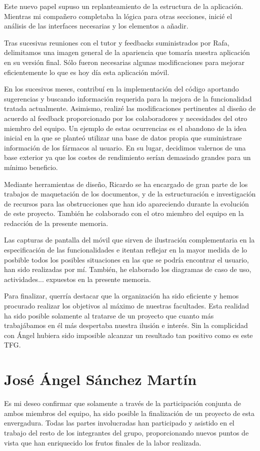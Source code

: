 \documentclass[11pt,spanish,
		listoftables,listoffigures]
		{tfgplantilla}
\begin{document}
Este nuevo papel supuso un replanteamiento de la estructura de la aplicación. Mientras mi compañero completaba la lógica para otras secciones, inicié el análisis de las interfaces necesarias y los elementos a añadir.

Tras sucesivas reuniones con el tutor y feedbacks suministrados por Rafa, delimitamos una imagen general de la apariencia que tomaría nuestra aplicación en su versión final. Sólo fueron necesarias algunas modificaciones para mejorar eficientemente lo que es hoy día esta aplicación móvil.

En los sucesivos meses, contribuí en la implementación del código aportando sugerencias y buscando información requerida para la mejora de la funcionalidad tratada actualmente.
Asimismo, realizé las modificaciones pertinentes al diseño de acuerdo al feedback proporcionado por los colaboradores y necesidades del otro miembro del equipo. Un ejemplo de estas ocurrencias es el abandono de la idea inicial en la que se planteó utilizar una base de datos propia que suministrase información de los fármacos al usuario. En su lugar, decidimos valernos de una base exterior ya que los costes de rendimiento serían demasiado grandes para un mínimo beneficio.

Mediante herramientas de diseño, Ricardo se ha encargado de gran parte de los trabajos de maquetación de los documentos, y de la estructuración e investigación de recursos para las obstrucciones que han ido apareciendo durante la evolución de este proyecto. También he colaborado con el otro miembro del equipo en la redacción de la presente memoria.

Las capturas de pantalla del móvil que sirven de ilustración complementaria en la especificación de las funcionalidades e itentan reflejar en la mayor medida de lo posbible todos los posibles situaciones en las que se podría encontrar el usuario, han sido realizadas por mí. También, he elaborado los diagramas de caso de uso, actividades... expuestos en la presente memoria.

Para finalizar, querría destacar que la organización ha sido eficiente y hemos procurado realizar los objetivos al máximo de nuestras facultades. Esta realidad ha sido posible solamente al tratarse de un proyecto que cuanto más trabajábamos en él más despertaba nuestra ilusión e interés. Sin la complicidad con Ángel hubiera sido imposible alcanzar un resultado tan positivo como es este TFG. 
 
\newpage
\section{José Ángel Sánchez Martín}
Es mi deseo confirmar que solamente a través de la participación conjunta de ambos miembros del equipo, ha sido posible la finalización de un proyecto de esta envergadura.
Todas las partes involucradas han participado y asistido en el trabajo del resto de los integrantes del grupo, proporcionando nuevos puntos de vista que han enriquecido los frutos finales de la labor realizada.
\end{document}
